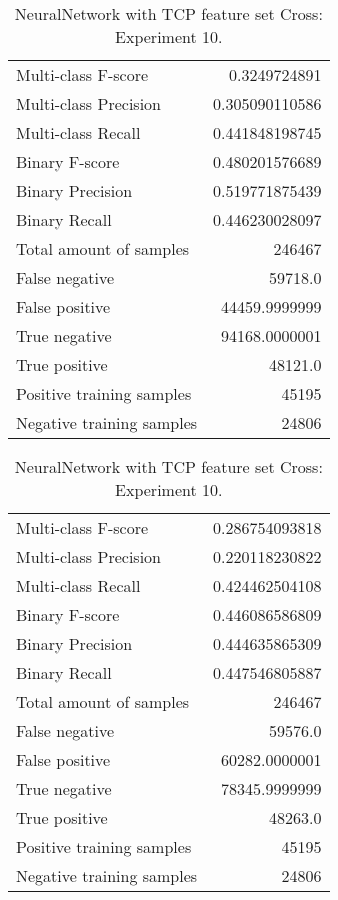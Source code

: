 \begin{table}[H]
\begin{minipage}{0.5\textwidth}
\caption{NeuralNetwork with TCP feature set Cross: \\Experiment 9.}
\centering
\begin{tabular}{l r}
\toprule
Multi-class F-score & 0.3249724891 \\
Multi-class Precision & 0.305090110586 \\
Multi-class Recall & 0.441848198745 \\
\midrule
Binary F-score & 0.480201576689 \\
Binary Precision & 0.519771875439 \\
Binary Recall & 0.446230028097 \\
\midrule
Total amount of samples & 246467 \\
False negative & 59718.0 \\
False positive & 44459.9999999 \\
True negative & 94168.0000001 \\
True positive & 48121.0 \\
\midrule
Positive training samples & 45195 \\
Negative training samples & 24806 \\
\bottomrule
\end{tabular}
\end{minipage}
\hfillx
\begin{minipage}{0.5\textwidth}
\caption{NeuralNetwork with TCP feature set Cross: \\Experiment 10.}
\centering
\begin{tabular}{l r}
\toprule
Multi-class F-score & 0.286754093818 \\
Multi-class Precision & 0.220118230822 \\
Multi-class Recall & 0.424462504108 \\
\midrule
Binary F-score & 0.446086586809 \\
Binary Precision & 0.444635865309 \\
Binary Recall & 0.447546805887 \\
\midrule
Total amount of samples & 246467 \\
False negative & 59576.0 \\
False positive & 60282.0000001 \\
True negative & 78345.9999999 \\
True positive & 48263.0 \\
\midrule
Positive training samples & 45195 \\
Negative training samples & 24806 \\
\bottomrule
\end{tabular}
\end{minipage}
\end{table}

